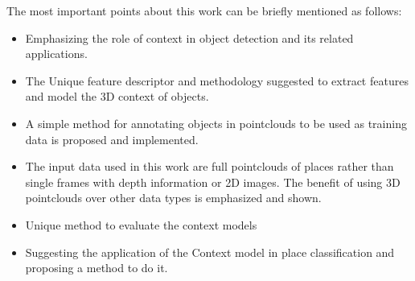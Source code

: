  The most important points about this work can be briefly mentioned as follows:
 
 \begin{itemize}
  \item Emphasizing the role of context in object detection and its related applications.
  \item The Unique feature descriptor and methodology suggested to extract features and model the 3D context of objects.
  \item A simple method for annotating objects in pointclouds to be used as training data is proposed and implemented.
  \item The input data used in this work are full pointclouds of places rather than single frames with depth information or 
  2D images. The benefit of using 3D pointclouds over other data types is emphasized and shown.
  \item Unique method to evaluate the context models
  \item Suggesting the application of the Context model in place classification and proposing a method to do it.
  
 \end{itemize}

 
% 

